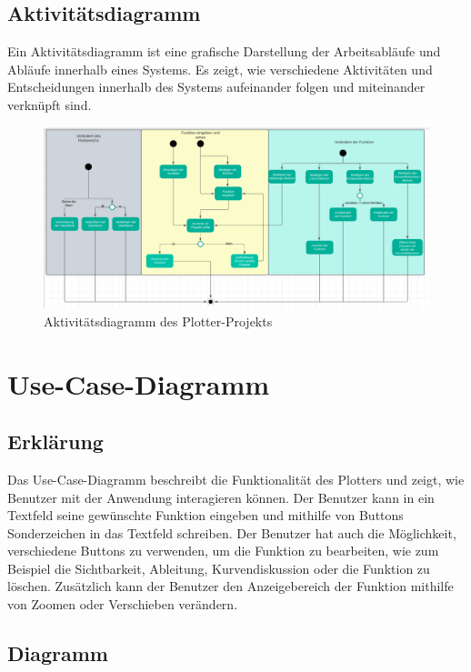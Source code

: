 \documentclass[a4paper]{article}
\begin{document}
\newpage

\subsection{Aktivitätsdiagramm}
Ein Aktivitätsdiagramm ist eine grafische Darstellung der Arbeitsabläufe und Abläufe innerhalb eines Systems. Es zeigt, wie verschiedene Aktivitäten und Entscheidungen innerhalb des Systems aufeinander folgen und miteinander verknüpft sind.

\begin{figure}[ht]
	\centering
	\includegraphics[width=1\textwidth]{Resources/aktivitaetsdiagramm.png}
	\caption{Aktivitätsdiagramm des Plotter-Projekts}
	\label{fig:aktivitaetsdiagramm}
\end{figure}

\newpage

\section{Use-Case-Diagramm}

\subsection{Erklärung}

Das Use-Case-Diagramm beschreibt die Funktionalität des Plotters und zeigt, wie Benutzer mit der Anwendung interagieren können. Der Benutzer kann in ein Textfeld seine gewünschte Funktion eingeben und mithilfe von Buttons Sonderzeichen in das Textfeld schreiben. Der Benutzer hat auch die Möglichkeit, verschiedene Buttons zu verwenden, um die Funktion zu bearbeiten, wie zum Beispiel die Sichtbarkeit, Ableitung, Kurvendiskussion oder die Funktion zu löschen. Zusätzlich kann der Benutzer den Anzeigebereich der Funktion mithilfe von Zoomen oder Verschieben verändern.

\subsection{Diagramm}
\end{document}
